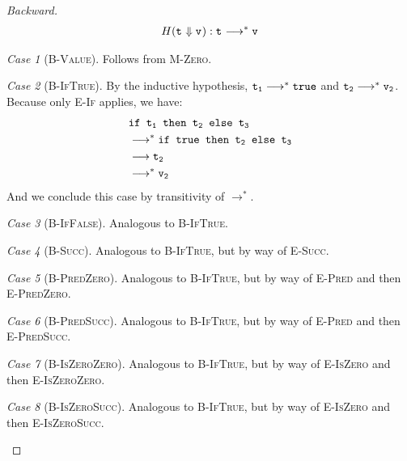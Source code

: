 \documentclass{article}
\newcommand{\term}[1]{\texttt{t\textsubscript{#1}}}
\newcommand{\val}[1]{\texttt{v\textsubscript{#1}}}
\renewcommand{\ss}[2]{#1 \longrightarrow^* #2}
\renewcommand{\bs}[2]{#1 \Downarrow #2}
\newcommand{\ms}[1]{\texttt{#1}}
\theoremstyle{remark}
\newtheorem*{case}{Case}
\begin{document}
    \begin{proof}[Backward]
        \begin{align*}
            H(\bs{\term{}}{\val{}}): \ss{\term{}}{\val{}}
        \end{align*}

        \begin{case}[\textsc{B-Value}]
            Follows from \textsc{M-Zero}.
        \end{case}

        \begin{case}[\textsc{B-IfTrue}]
            By the inductive hypothesis, $\ss{\term{1}}{\texttt{true}}$ and $\ss{\term{2}}{\val{2}}$.
            Because only \textsc{E-If} applies, we have:
            \begin{align*}
                &\ms{if \term{1} then \term{2} else \term{3}} \\
                &\longrightarrow^* \ms{if true then \term{2} else \term{3}} \\
                &\longrightarrow \term{2} \\
                &\longrightarrow^* \val{2}
            \end{align*}
            And we conclude this case by transitivity of $\longrightarrow^*$.
        \end{case}

        \begin{case}[\textsc{B-IfFalse}]
            Analogous to \textsc{B-IfTrue}.
        \end{case}

        \begin{case}[\textsc{B-Succ}]
            Analogous to \textsc{B-IfTrue}, but by way of \textsc{E-Succ}.
        \end{case}

        \begin{case}[\textsc{B-PredZero}]
            Analogous to \textsc{B-IfTrue}, but by way of \textsc{E-Pred} and then \textsc{E-PredZero}.
        \end{case}

        \begin{case}[\textsc{B-PredSucc}]
            Analogous to \textsc{B-IfTrue}, but by way of \textsc{E-Pred} and then \textsc{E-PredSucc}.
        \end{case}

        \begin{case}[\textsc{B-IsZeroZero}]
            Analogous to \textsc{B-IfTrue}, but by way of \textsc{E-IsZero} and then \textsc{E-IsZeroZero}.
        \end{case}

        \begin{case}[\textsc{B-IsZeroSucc}]
            Analogous to \textsc{B-IfTrue}, but by way of \textsc{E-IsZero} and then \textsc{E-IsZeroSucc}.
        \end{case}
    \end{proof}
\end{document}
